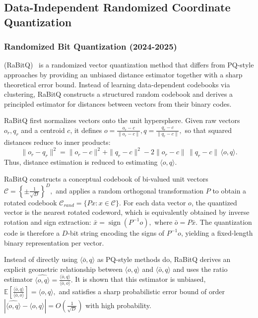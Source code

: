 \documentclass[sigconf]{acmart}
\begin{document}

\subsection{Data-Independent Randomized Coordinate Quantization}
\subsubsection{\textbf{Randomized Bit Quantization (2024-2025)}} (RaBitQ)~\cite{rabitq} is a randomized vector quantization method that differs from PQ-style approaches by providing an unbiased distance estimator together with a sharp theoretical error bound. 
Instead of learning data-dependent codebooks via clustering, RaBitQ constructs a structured random codebook and derives a principled estimator for distances between vectors from their binary codes.

RaBitQ first normalizes vectors onto the unit hypersphere. 
Given raw vectors $o_r, q_r$ and a centroid $c$, it defines
\(
o = \frac{o_r - c}{\|o_r - c\|}, 
q = \frac{q_r - c}{\|q_r - c\|},
\)
so that squared distances reduce to inner products:
\[
\|o_r - q_r\|^2
= \|o_r-c\|^2 + \|q_r-c\|^2
- 2 \|o_r-c\|\,\|q_r-c\| \,\langle o,q\rangle.
\]
Thus, distance estimation is reduced to estimating $\langle o,q\rangle$.

RaBitQ constructs a conceptual codebook of bi-valued unit vectors
\(\mathcal{C} = \left\{\pm \frac{1}{\sqrt{D}}\right\}^D,\)
and applies a random orthogonal transformation $P$ to obtain a rotated codebook
\(\mathcal{C}_{rand} = \{ P x : x \in \mathcal{C} \}.\)
For each data vector $o$, the quantized vector is the nearest rotated codeword, which is equivalently obtained by inverse rotation and sign extraction:
\(\bar{x} = \operatorname{sign}(P^{-1} o), \) where \(\bar{o} = P \bar{x}.\)
The quantization code is therefore a $D$-bit string encoding the signs of $P^{-1}o$, yielding a fixed-length binary representation per vector.

Instead of directly using $\langle \bar{o}, q\rangle$ as PQ-style methods do, RaBitQ derives an explicit geometric relationship between $\langle o,q\rangle$ and $\langle \bar{o}, q\rangle$ and uses the ratio estimator
\( \widehat{\langle o,q\rangle} = \frac{\langle \bar{o}, q\rangle}{\langle \bar{o}, o\rangle}.\)
It is shown that this estimator is unbiased,
\( \mathbb{E}\!\left[ \frac{\langle \bar{o}, q\rangle}{\langle \bar{o}, o\rangle} \right] = \langle o,q\rangle,\)
and satisfies a sharp probabilistic error bound of order
\( \left| \widehat{\langle o,q\rangle} - \langle o,q\rangle \right| = O\!\left(\frac{1}{\sqrt{D}}\right) \) with high probability.
\end{document}
